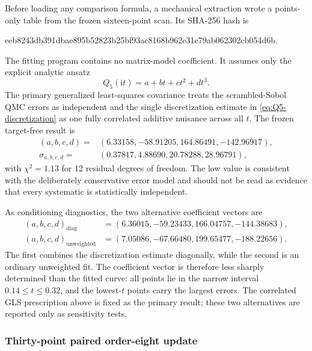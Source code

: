 \documentclass[11pt]{article}
\newcommand{\ii}{\mathrm{i}}
\begin{document}
Before loading any comparison formula, a mechanical extraction wrote a
points-only table from the frozen sixteen-point scan.  Its SHA-256 hash is
\begin{center}
\small\ttfamily
eeb8243db391dbae895b52823b25bf93ac8168b962e31e79ab062302cb054d6b.
\end{center}
The fitting program contains no matrix-model coefficient.  It assumes only
the explicit analytic ansatz
\begin{equation}
  Q_5(\ii t)=a+bt+ct^2+dt^3.
  \label{eq:Q5-worldsheet-fit-ansatz}
\end{equation}
The primary generalized least-squares covariance treats the scrambled-Sobol
QMC errors as independent and the single discretization estimate in
\eqref{eq:Q5-discretization} as one fully correlated additive nuisance across
all $t$.  The frozen target-free result is
\begin{equation}
\begin{split}
 (a,b,c,d)={}&(6.33158,-58.91205,164.86491,-142.96917),\\
 \sigma_{a,b,c,d}={}&(0.37817,4.88690,20.78288,28.96791),
\end{split}
\label{eq:Q5-worldsheet-cubic-fit}
\end{equation}
with $\chi^2=1.13$ for 12 residual degrees of freedom.  The low value is
consistent with the deliberately conservative error model and should not be
read as evidence that every systematic is statistically independent.

As conditioning diagnostics, the two alternative coefficient vectors are
\begin{align}
 (a,b,c,d)_{\mathrm{diag}}
   &=(6.36015,-59.23433,166.04757,-144.38683),\\
 (a,b,c,d)_{\mathrm{unweighted}}
   &=(7.05086,-67.66480,199.65477,-188.22656).
\end{align}
The first combines the discretization estimate diagonally, while the second
is an ordinary unweighted fit.  The coefficient vector is therefore
less sharply determined than the fitted curve: all points lie in the narrow
interval $0.14\leq t\leq0.32$, and the lowest-$t$ points carry the largest
errors.  The correlated GLS prescription above is fixed as the primary
result; these two alternatives are reported only as sensitivity tests.

\subsubsection{Thirty-point paired order-eight update}
\end{document}

